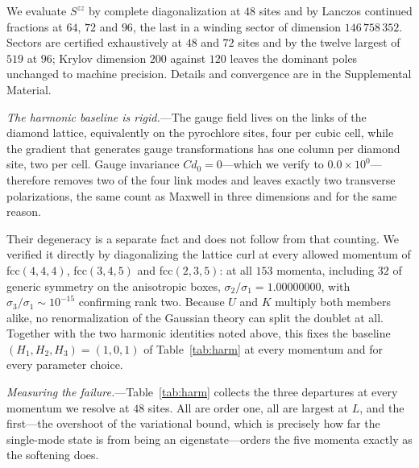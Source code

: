 \documentclass[
aps,prl,twocolumn,amsmath,amssymb,superscriptaddress,
longbibliography,floatfix
]{revtex4-2}
\newcommand{\Szz}{S^{zz}}
\begin{document}
We evaluate $\Szz$ by complete diagonalization at $48$ sites and by
Lanczos continued fractions at $64$, $72$ and $96$, the last in a winding
sector of dimension $146\,758\,352$. Sectors are certified exhaustively
at $48$ and $72$ sites and by the twelve largest of $519$ at $96$;
Krylov dimension $200$ against $120$ leaves the dominant poles unchanged
to machine precision. Details and convergence are in the Supplemental
Material.

\emph{The harmonic baseline is rigid.}---The gauge field lives on the
links of the diamond lattice, equivalently on the pyrochlore sites, four
per cubic cell, while the gradient that generates gauge transformations
has one column per diamond site, two per cell. Gauge invariance
$Cd_0=0$---which we verify to $0.0\times10^{0}$---therefore removes two
of the four link modes and leaves exactly two transverse polarizations,
the same count as Maxwell in three dimensions and for the same reason.

Their degeneracy is a separate fact and does not follow from that
counting. We verified it directly by diagonalizing the lattice curl at
every allowed momentum of fcc$(4,4,4)$, fcc$(3,4,5)$ and fcc$(2,3,5)$:
at all $153$ momenta, including $32$ of generic symmetry on the
anisotropic boxes, $\sigma_2/\sigma_1=1.00000000$, with
$\sigma_3/\sigma_1\sim10^{-15}$ confirming rank two. Because $U$ and $K$
multiply both members alike, no renormalization of the Gaussian theory
can split the doublet at all. Together with the two harmonic identities
noted above, this fixes the baseline $(H_1,H_2,H_3)=(1,0,1)$ of
Table~\ref{tab:harm} at every momentum and for every parameter choice.

\emph{Measuring the failure.}---Table~\ref{tab:harm} collects the three
departures at every momentum we resolve at $48$ sites. All are order
one, all are largest at $L$, and the first---the overshoot of the
variational bound, which is precisely how far the single-mode state is
from being an eigenstate---orders the five momenta exactly as the
softening does.
\end{document}

